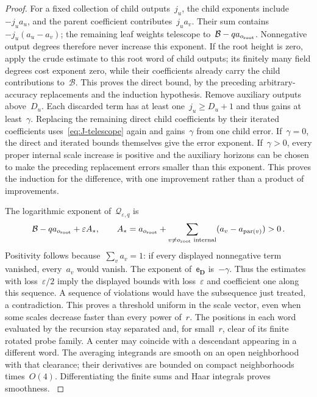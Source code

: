 \begin{proof}
For a fixed collection of child outputs~$j_u$, the child exponents include~$-j_ua_u$, and the parent coefficient contributes~$j_ua_v$. Their sum contains~$-j_u(a_u-a_v)$; the remaining leaf weights telescope to~$\mathcal B-qa_{o_{\rm root}}$. Nonnegative output degrees therefore never increase this exponent. If the root height is zero, apply the crude estimate to this root word of child outputs; its finitely many field degrees cost exponent zero, while their coefficients already carry the child contributions to~$\mathcal B$. This proves the direct bound, by the preceding arbitrary-accuracy replacements and the induction hypothesis. Remove auxiliary outputs above~$D_u$. Each discarded term has at least one~$j_u\ge D_u+1$ and thus gains at least~$\gamma$. Replacing the remaining direct child coefficients by their iterated coefficients uses~\eqref{eq:J-telescope} again and gains~$\gamma$ from one child error. If~$\gamma=0$, the direct and iterated bounds themselves give the error exponent. If~$\gamma>0$, every proper internal scale increase is positive and the auxiliary horizons can be chosen to make the preceding replacement errors smaller than this exponent. This proves the induction for the difference, with one improvement rather than a product of improvements.

The logarithmic exponent of~$\mathcal Q_{\varepsilon,q}$ is
\begin{equation*}
\mathcal B-qa_{o_{\rm root}}+\varepsilon A_*,\qquad
A_*=a_{o_{\rm root}}+\sum_{v\ne o_{\rm root}\text{ internal}}(a_v-a_{\operatorname{par}(v)})>0\,.
\end{equation*}
Positivity follows because~$\sum_va_v=1$: if every displayed nonnegative term vanished, every~$a_v$ would vanish. The exponent of~$\mathsf e_{\boldsymbol D}$ is~$-\gamma$. Thus the estimates with loss~$\varepsilon/2$ imply the displayed bounds with loss~$\varepsilon$ and coefficient one along this sequence. A sequence of violations would have the subsequence just treated, a contradiction. This proves a threshold uniform in the scale vector, even when some scales decrease faster than every power of~$r$. The positions in each word evaluated by the recursion stay separated and, for small~$r$, clear of its finite rotated probe family. A center may coincide with a descendant appearing in a different word. The averaging integrands are smooth on an open neighborhood with that clearance; their derivatives are bounded on compact neighborhoods times~$O(4)$. Differentiating the finite sums and Haar integrals proves smoothness.\qedhere
\label{proof:J1.4-end}
\end{proof}

